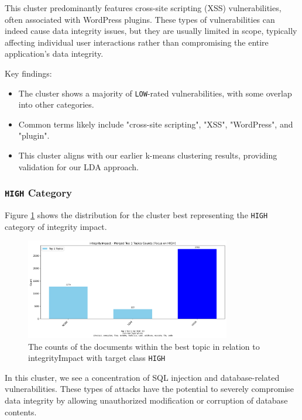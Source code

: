 This cluster predominantly features cross-site scripting (XSS) vulnerabilities, often associated with WordPress plugins. These types of vulnerabilities can indeed cause data integrity issues, but they are usually limited in scope, typically affecting individual user interactions rather than compromising the entire application's data integrity.

Key findings:
\begin{itemize}
	\item The cluster shows a majority of \texttt{LOW}-rated vulnerabilities, with some overlap into other categories.
	\item Common terms likely include "cross-site scripting", "XSS", "WordPress", and "plugin".
	\item This cluster aligns with our earlier k-means clustering results, providing validation for our LDA approach.
\end{itemize}

\subsubsection{\texttt{HIGH} Category}
Figure \ref{fig:integrityImpact_20_HIGH} shows the distribution for the cluster best representing the \texttt{HIGH} category of integrity impact.

\begin{figure}[h]
	\centering
	\includegraphics[width=0.8\textwidth]{figures/integrityImpact/merged_top_k_topics_category_focus_counts_integrityImpact_HIGH_k1.png}
	\caption{The counts of the documents within the best topic in relation to integrityImpact with target class \texttt{HIGH}}
	\label{fig:integrityImpact_20_HIGH}
\end{figure}

In this cluster, we see a concentration of SQL injection and database-related vulnerabilities. These
types of attacks have the potential to severely compromise data integrity by allowing unauthorized
modification or corruption of database contents.

